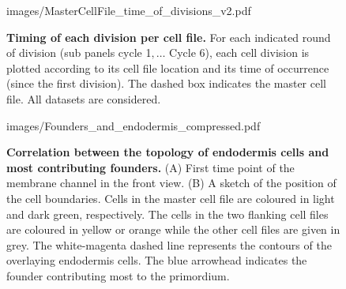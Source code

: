 \documentclass[11pt,a4paper, final]{article}
\begin{document}
%
\begin{figure}[htbp]
\centering
	\begin{overpic}[width=1.\linewidth]{images/MasterCellFile_time_of_divisions_v2.pdf}
	\end{overpic}
\caption[Timing of each division per cell file.]
{{\bf Timing of each division per cell file.} For each indicated round of division (sub panels cycle 1$, \ldots$ Cycle 6), each cell division is plotted according to its cell file location and its time of occurrence (since the first division). The dashed box indicates the master cell file. All datasets are considered.
}
	\label{fig:mastertimediv}
\end{figure}
%
\clearpage
%
\begin{figure}[htbp]
\centering
	\begin{overpic}[width=0.5\linewidth]{images/Founders_and_endodermis_compressed.pdf}
	\end{overpic}
\caption[Correlation between the topology of endodermis cells and most contributing founders.]
{{\bf Correlation between the topology of endodermis cells and most contributing founders.} (A) First time point of the membrane channel in the front view. (B) A sketch of the position of the cell boundaries. Cells in the master cell file are coloured in light and dark green, respectively. The cells in the two flanking cell files are coloured in yellow or orange while the other cell files are given in grey. The white-magenta dashed line represents the contours of the overlaying endodermis cells. The blue arrowhead indicates the founder contributing most to the primordium.}
	\label{fig:foundersendo}
\end{figure}
%
\clearpage
\end{document}
